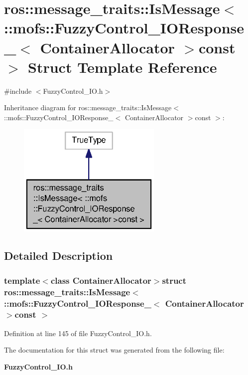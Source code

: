 \section{ros\-:\-:message\-\_\-traits\-:\-:Is\-Message$<$ \-:\-:mofs\-:\-:Fuzzy\-Control\-\_\-\-I\-O\-Response\-\_\-$<$ Container\-Allocator $>$const $>$ Struct Template Reference}
\label{structros_1_1message__traits_1_1IsMessage_3_01_1_1mofs_1_1FuzzyControl__IOResponse___3_01ContainerAllocator_01_4const_01_01_4}


{\ttfamily \#include $<$Fuzzy\-Control\-\_\-\-I\-O.\-h$>$}



Inheritance diagram for ros\-:\-:message\-\_\-traits\-:\-:Is\-Message$<$ \-:\-:mofs\-:\-:Fuzzy\-Control\-\_\-\-I\-O\-Response\-\_\-$<$ Container\-Allocator $>$const $>$\-:\nopagebreak
\begin{figure}[H]
\begin{center}
\leavevmode
\includegraphics[width=196pt]{structros_1_1message__traits_1_1IsMessage_3_01_1_1mofs_1_1FuzzyControl__IOResponse___3_01Contain8f713a70a01aa5e3c9f892c201a7a429}
\end{center}
\end{figure}


\subsection{Detailed Description}
\subsubsection*{template$<$class Container\-Allocator$>$struct ros\-::message\-\_\-traits\-::\-Is\-Message$<$ \-::mofs\-::\-Fuzzy\-Control\-\_\-\-I\-O\-Response\-\_\-$<$ Container\-Allocator $>$const  $>$}



Definition at line 145 of file Fuzzy\-Control\-\_\-\-I\-O.\-h.



The documentation for this struct was generated from the following file\-:\begin{DoxyCompactItemize}
\item 
{\bf Fuzzy\-Control\-\_\-\-I\-O.\-h}\end{DoxyCompactItemize}

